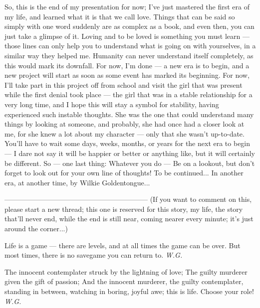 So, this is the end of my presentation for now; I've just mastered the first era of my life, and learned what it is that we call love. Things that can be said so simply with one word suddenly are as complex as a book, and even then, you can just take a glimpse of it. Loving and to be loved is something you must learn --- those lines can only help you to understand what is going on with yourselves, in a similar way they helped me. Humanity can never understand itself completely, as this would mark its downfall. 
For now, I'm done --- a new era is to begin, and a new project will start as soon as some event has marked its beginning. For now, I'll take part in this project off from school and visit the girl that was present while the first denial took place --- the girl that was in a stable relationship for a very long time, and I hope this will stay a symbol for stability, having experienced such instable thoughts. She was the one that could understand many things by looking at someone, and probably, she had once had a closer look at me, for she knew a lot about my character --- only that she wasn't up-to-date. 
You'll have to wait some days, weeks, months, or years for the next era to begin --- I dare not say it will be happier or better or anything like, but it will certainly be different. 
So --- one last thing: Whatever you do --- Be on a lookout, but don't forget to look out for your own line of thoughts! 
To be continued...
In another era, at another time, by Wilkie Goldentongue...

--------------------------------------------------------------
(If you want to comment on this, please start a new thread; this one is reserved for this story, my life, the story that'll never end, while the end is still near, coming nearer every minute; it's just around the corner...)

Life is a game --- 
there are levels, 
and at all times 
the game can be over. 
But most times, 
there is no savegame 
you can return to. 
\emph{W.G.}

The innocent contemplater struck 
by the lightning of love; 
The guilty murderer given 
the gift of passion; 
And the innocent murderer, 
the guilty contemplater, 
standing in between, 
watching in boring, 
joyful awe; 
this is life. 
Choose your role! 
\emph{W.G.}
